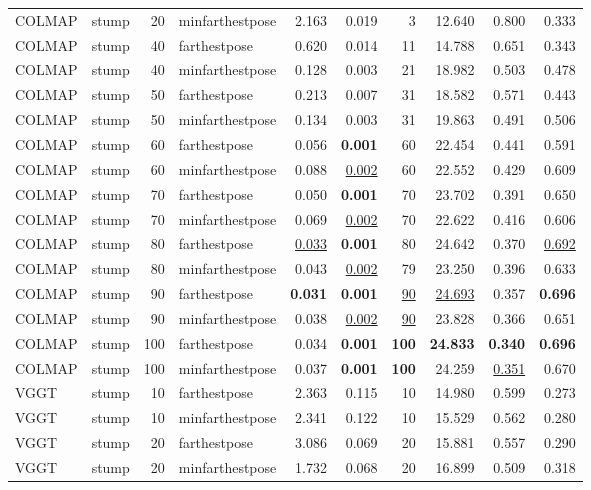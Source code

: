 \begin{table}[H]
\begin{tabular}{llrlrrrrrr}
COLMAP & stump & 20 & minfarthestpose & 2.163 & 0.019 & 3 & 12.640 & 0.800 & 0.333 \\
COLMAP & stump & 40 & farthestpose & 0.620 & 0.014 & 11 & 14.788 & 0.651 & 0.343 \\
COLMAP & stump & 40 & minfarthestpose & 0.128 & 0.003 & 21 & 18.982 & 0.503 & 0.478 \\
COLMAP & stump & 50 & farthestpose & 0.213 & 0.007 & 31 & 18.582 & 0.571 & 0.443 \\
COLMAP & stump & 50 & minfarthestpose & 0.134 & 0.003 & 31 & 19.863 & 0.491 & 0.506 \\
COLMAP & stump & 60 & farthestpose & 0.056 & \textbf{0.001} & 60 & 22.454 & 0.441 & 0.591 \\
COLMAP & stump & 60 & minfarthestpose & 0.088 & \underline{0.002} & 60 & 22.552 & 0.429 & 0.609 \\
COLMAP & stump & 70 & farthestpose & 0.050 & \textbf{0.001} & 70 & 23.702 & 0.391 & 0.650 \\
COLMAP & stump & 70 & minfarthestpose & 0.069 & \underline{0.002} & 70 & 22.622 & 0.416 & 0.606 \\
COLMAP & stump & 80 & farthestpose & \underline{0.033} & \textbf{0.001} & 80 & 24.642 & 0.370 & \underline{0.692} \\
COLMAP & stump & 80 & minfarthestpose & 0.043 & \underline{0.002} & 79 & 23.250 & 0.396 & 0.633 \\
COLMAP & stump & 90 & farthestpose & \textbf{0.031} & \textbf{0.001} & \underline{90} & \underline{24.693} & 0.357 & \textbf{0.696} \\
COLMAP & stump & 90 & minfarthestpose & 0.038 & \underline{0.002} & \underline{90} & 23.828 & 0.366 & 0.651 \\
COLMAP & stump & 100 & farthestpose & 0.034 & \textbf{0.001} & \textbf{100} & \textbf{24.833} & \textbf{0.340} & \textbf{0.696} \\
COLMAP & stump & 100 & minfarthestpose & 0.037 & \textbf{0.001} & \textbf{100} & 24.259 & \underline{0.351} & 0.670 \\
VGGT & stump & 10 & farthestpose & 2.363 & 0.115 & 10 & 14.980 & 0.599 & 0.273 \\
VGGT & stump & 10 & minfarthestpose & 2.341 & 0.122 & 10 & 15.529 & 0.562 & 0.280 \\
VGGT & stump & 20 & farthestpose & 3.086 & 0.069 & 20 & 15.881 & 0.557 & 0.290 \\
VGGT & stump & 20 & minfarthestpose & 1.732 & 0.068 & 20 & 16.899 & 0.509 & 0.318 \\

\end{tabular}
\end{table}
